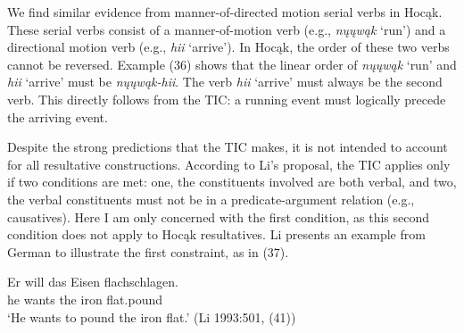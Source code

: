 \documentclass[output=paper]{LSP/langsci}
\begin{document}
We find similar evidence from manner-of-directed motion serial verbs in Hoc\k{a}k. These serial verbs consist of a manner-of-motion verb (e.g., \textit{n\k{u}\k{u}w\k{a}k} `run') and a directional motion verb (e.g., \textit{hii} `arrive'). In Hoc\k{a}k, the order of these two verbs cannot be reversed. Example (36) shows that the linear order of \textit{n\k{u}\k{u}w\k{a}k} `run' and \textit{hii} `arrive' must be \textit{n\k{u}\k{u}w\k{a}k-hii}. The verb \textit{hii} `arrive' must always be the second verb. This directly follows from the TIC: a running event must logically precede the arriving event.

\begin{exe}
\ex
\begin{xlist}



\end{xlist}
\end{exe}

Despite the strong predictions that the TIC makes, it is not intended to account for all resultative constructions. According to Li's proposal, the TIC applies only if two conditions are met: one, the constituents involved are both verbal, and two, the verbal constituents must not be in a predicate-argument relation (e.g., causatives). Here I am only concerned with the first condition, as this second condition does not apply to Hoc\k{a}k resultatives. Li presents an example from German to illustrate the first constraint, as in (37).

\begin{exe}

\ex \gll Er will das Eisen flachschlagen.\\
he wants the iron flat.pound\\
\glt `He wants to pound the iron flat.' (Li 1993:501, (41))

\end{exe}
\end{document}
